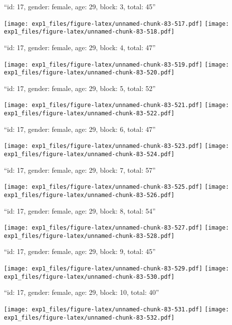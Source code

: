 \documentclass[11pt,,]{article}
\begin{document}
\newpage
[1] 

``id: 17, gender: female, age: 29, block: 3, total: 45''

\texttt{[image: exp1\_files/figure-latex/unnamed-chunk-83-517.pdf]}
\texttt{[image: exp1\_files/figure-latex/unnamed-chunk-83-518.pdf]}

\newpage
[1] 

``id: 17, gender: female, age: 29, block: 4, total: 47''

\texttt{[image: exp1\_files/figure-latex/unnamed-chunk-83-519.pdf]}
\texttt{[image: exp1\_files/figure-latex/unnamed-chunk-83-520.pdf]}

\newpage
[1] 

``id: 17, gender: female, age: 29, block: 5, total: 52''

\texttt{[image: exp1\_files/figure-latex/unnamed-chunk-83-521.pdf]}
\texttt{[image: exp1\_files/figure-latex/unnamed-chunk-83-522.pdf]}

\newpage
[1] 

``id: 17, gender: female, age: 29, block: 6, total: 47''

\texttt{[image: exp1\_files/figure-latex/unnamed-chunk-83-523.pdf]}
\texttt{[image: exp1\_files/figure-latex/unnamed-chunk-83-524.pdf]}

\newpage
[1] 

``id: 17, gender: female, age: 29, block: 7, total: 57''

\texttt{[image: exp1\_files/figure-latex/unnamed-chunk-83-525.pdf]}
\texttt{[image: exp1\_files/figure-latex/unnamed-chunk-83-526.pdf]}

\newpage
[1] 

``id: 17, gender: female, age: 29, block: 8, total: 54''

\texttt{[image: exp1\_files/figure-latex/unnamed-chunk-83-527.pdf]}
\texttt{[image: exp1\_files/figure-latex/unnamed-chunk-83-528.pdf]}

\newpage
[1] 

``id: 17, gender: female, age: 29, block: 9, total: 45''

\texttt{[image: exp1\_files/figure-latex/unnamed-chunk-83-529.pdf]}
\texttt{[image: exp1\_files/figure-latex/unnamed-chunk-83-530.pdf]}

\newpage
[1] 

``id: 17, gender: female, age: 29, block: 10, total: 40''

\texttt{[image: exp1\_files/figure-latex/unnamed-chunk-83-531.pdf]}
\texttt{[image: exp1\_files/figure-latex/unnamed-chunk-83-532.pdf]}
\end{document}
